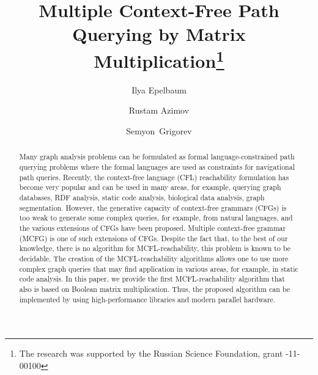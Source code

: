 \documentclass[runningheads,table]{llncs}
\begin{document}
%
\title{Multiple Context-Free Path Querying by Matrix Multiplication\thanks{The research was supported by the Russian Science Foundation, grant -11-00100}}
%
%
\author{Ilya Epelbaum \and
Rustam Azimov \and
Semyon~Grigorev}
%
%
%
\maketitle              %
%
\begin{abstract}
Many graph analysis problems can be formulated as formal language-constrained path querying problems where the formal languages are used as constraints for
navigational path queries. Recently, the context-free language (CFL) reachability formulation has become very popular and can be used in many areas, for example, querying graph databases, RDF analysis, static code analysis, biological data analysis, graph segmentation. However, the generative capacity of context-free grammars (CFGs) is too weak to generate some complex queries, for example, from natural languages, and the various extensions of CFGs have been proposed. Multiple context-free grammar (MCFG) is one of such extensions of CFGs. Despite the fact that, to the best of our knowledge, there is no algorithm for MCFL-reachability, this problem is known to be decidable. The creation of the MCFL-reachability algorithms allows one to use more complex graph queries that may find application in various areas, for example, in static code analysis. In this paper, we provide the first MCFL-reachability algorithm that also is based on Boolean matrix multiplication. Thus, the proposed algorithm can be implemented by using high-performance libraries and modern parallel hardware.


\end{abstract}
%
%
%







%
%
%
 
 
\end{document}
